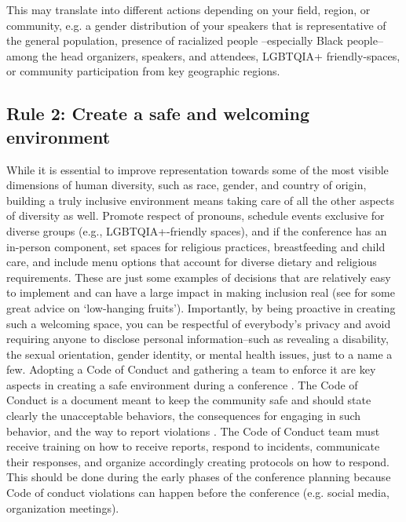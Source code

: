 \documentclass[10pt,letterpaper]{article}
\begin{document}
This may translate into different actions depending on your field, region, or community, e.g. a gender distribution of your speakers that is representative of the general population, presence of racialized people --especially Black people-- among the head organizers, speakers, and attendees, LGBTQIA+ friendly-spaces, or community participation from key geographic regions.


\subsection*{Rule 2: Create a safe and welcoming environment}
\label{rule_inclusion}

While it is essential to improve representation towards some of the most visible dimensions of human diversity, such as race, gender, and country of origin, building a truly inclusive environment means taking care of all the other aspects of diversity as well. 
Promote respect of pronouns, schedule events exclusive for diverse groups (e.g., LGBTQIA+-friendly spaces), and if the conference has an in-person component, set spaces for religious practices, breastfeeding and child care, and include menu options that account for diverse dietary and religious requirements. These are just some examples of decisions that are relatively easy to implement and can have a large impact in making inclusion real (see \cite{noauthor_discover2021} for some great advice on `low-hanging fruits').
Importantly, by being proactive in creating such a welcoming space, you can be respectful of everybody's privacy and avoid requiring anyone to disclose personal information–such as revealing a disability, the sexual orientation, gender identity, or mental health issues, just to a name a few.
Adopting a Code of Conduct and gathering a team to enforce it are key aspects in creating a safe environment during a conference \cite{favaroYourScienceConference2016}.
The Code of Conduct is a document meant to keep the community safe and should state clearly the unacceptable behaviors, the consequences for engaging in such behavior, and the way to report violations \cite{auroraHowRespondCode2019}. 
The Code of Conduct team must receive training on how to receive reports, respond to incidents, communicate their responses, and organize accordingly creating protocols on how to respond. This should be done during the early phases of the conference planning because Code of conduct violations can happen before the conference (e.g. social media, organization meetings).  
\end{document}
